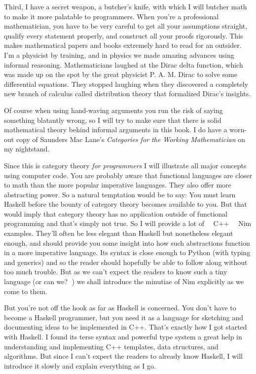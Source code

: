 Third, I have a secret weapon, a butcher's knife, with which I will
butcher math to make it more palatable to programmers. When you're a
professional mathematician, you have to be very careful to get all your
assumptions straight, qualify every statement properly, and construct
all your proofs rigorously. This makes mathematical papers and books
extremely hard to read for an outsider. I'm a physicist by training, and
in physics we made amazing advances using informal reasoning.
Mathematicians laughed at the Dirac delta function, which was made up on
the spot by the great physicist P. A. M. Dirac to solve some
differential equations. They stopped laughing when they discovered a
completely new branch of calculus called distribution theory that
formalized Dirac's insights.

Of course when using hand-waving arguments you run the risk of saying
something blatantly wrong, so I will try to make sure that there is
solid mathematical theory behind informal arguments in this book. I do
have a worn-out copy of Saunders Mac Lane's \emph{Categories for
  the Working Mathematician} on my nightstand.

Since this is category theory \emph{for programmers} I will illustrate
all major concepts using computer code. You are probably aware that
functional languages are closer to math than the more popular imperative
languages. They also offer more abstracting power. So a natural
temptation would be to say: You must learn Haskell before the bounty of
category theory becomes available to you. But that would imply that
category theory has no application outside of functional programming and
that's simply not true. So I will provide a lot of ~~C++~~ Nim examples.
They'll often be less elegant than Haskell but nonetheless elegant enough,
and should provide you some insight into how such abstractions function
in a more imperative language. Its syntax is close enough to Python
(with typing and generics) and so the reader should hopefully be able to
follow along without too much trouble. But as we can't expect the readers to
know such a tiny language (or can we? 👀) we shall introduce the minutiae of
Nim explicitly as we come to them.

But you're not off the hook as far as Haskell is concerned. You don't
have to become a Haskell programmer, but you need it as a language for
sketching and documenting ideas to be implemented in C++. That's exactly
how I got started with Haskell. I found its terse syntax and powerful
type system a great help in understanding and implementing C++
templates, data structures, and algorithms. But since I can't expect the
readers to already know Haskell, I will introduce it slowly and explain
everything as I go.

